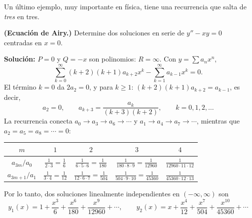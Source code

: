 Un último ejemplo, muy importante en física, tiene una recurrencia que salta de \emph{tres} en tres.
 
\begin{example}\label{ex:s2-airy}
\textbf{(Ecuación de Airy.)} Determine dos soluciones en serie de $y''-xy=0$ centradas en $x=0$.
 
\noindent \textbf{Solución:} \quad $P=0$ y $Q=-x$ son polinomios: $R=\infty$. Con $y=\sum a_nx^n$,
\[ \sum_{k=0}^{\infty}(k+2)(k+1)a_{k+2}x^k-\sum_{k=1}^{\infty}a_{k-1}x^k=0 . \]
El término $k=0$ da $2a_2=0$, y para $k\ge 1$: $(k+2)(k+1)a_{k+2}=a_{k-1}$, es decir,
\[ a_2=0,\qquad a_{k+3}=\frac{a_k}{(k+3)(k+2)},\qquad k=0,1,2,\dots \]
La recurrencia conecta $a_0\to a_3\to a_6\to\cdots$ y $a_1\to a_4\to a_7\to\cdots$, mientras que $a_2=a_5=a_8=\cdots=0$:
\begin{center}
\small
\begin{tabular}{|c|c|c|c|c|}
\hline
\rowcolor{bbe!15}$m$ & $1$ & $2$ & $3$ & $4$ \\ \hline
$a_{3m}/a_0$ & $\frac{1}{2\cdot 3}=\frac1{6}$ & $\frac{1}{6\cdot 5\cdot 6}=\frac{1}{180}$ & $\frac{1}{180\cdot 8\cdot 9}=\frac{1}{12960}$ & $\frac{1}{12960\cdot 11\cdot 12}$ \\ \hline
$a_{3m+1}/a_1$ & $\frac{1}{3\cdot 4}=\frac1{12}$ & $\frac{1}{12\cdot 6\cdot 7}=\frac{1}{504}$ & $\frac{1}{504\cdot 9\cdot 10}=\frac{1}{45360}$ & $\frac{1}{45360\cdot 12\cdot 13}$ \\ \hline
\end{tabular}
\end{center}
Por lo tanto, dos soluciones linealmente independientes en $(-\infty,\infty)$ son
\[ y_1(x)=1+\frac{x^3}{6}+\frac{x^6}{180}+\frac{x^9}{12960}+\cdots,\qquad y_2(x)=x+\frac{x^4}{12}+\frac{x^7}{504}+\frac{x^{10}}{45360}+\cdots \tag*{$\square$} \]
\end{example}
 
